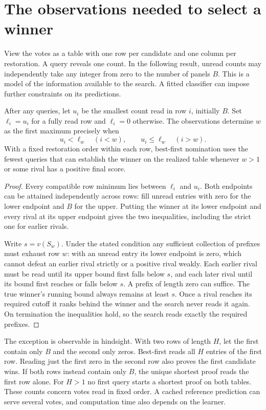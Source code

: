 \section{The observations needed to select a winner}
\label{sec:certificate}
View the votes as a table with one row per candidate and one column per restoration. A query reveals one count. In the following result, unread counts may independently take any integer from zero to the number of panels \(B\). This is a model of the information available to the search. A fitted classifier can impose further constraints on its predictions.

\begin{proposition}
After any queries, let \(u_i\) be the smallest count read in row \(i\), initially \(B\). Set \(\ell_i=u_i\) for a fully read row and \(\ell_i=0\) otherwise. The observations determine \(w\) as the first maximum precisely when
\[
  u_i<\ell_w\quad(i<w),\qquad u_i\le\ell_w\quad(i>w).
\]
With a fixed restoration order within each row, best-first nomination uses the fewest queries that can establish the winner on the realized table whenever \(w>1\) or some rival has a positive final score.
\end{proposition}

\begin{proof}
Every compatible row minimum lies between \(\ell_i\) and \(u_i\). Both endpoints can be attained independently across rows: fill unread entries with zero for the lower endpoint and \(B\) for the upper. Putting the winner at its lower endpoint and every rival at its upper endpoint gives the two inequalities, including the strict one for earlier rivals.

Write \(s=v(S_w)\). Under the stated condition any sufficient collection of prefixes must exhaust row \(w\): with an unread entry its lower endpoint is zero, which cannot defeat an earlier rival strictly or a positive rival weakly. Each earlier rival must be read until its upper bound first falls below \(s\), and each later rival until its bound first reaches or falls below \(s\). A prefix of length zero can suffice. The true winner's running bound always remains at least \(s\). Once a rival reaches its required cutoff it ranks behind the winner and the search never reads it again. On termination the inequalities hold, so the search reads exactly the required prefixes.
\end{proof}

The exception is observable in hindsight. With two rows of length \(H\), let the first contain only \(B\) and the second only zeros. Best-first reads all \(H\) entries of the first row. Reading just the first zero in the second row also proves the first candidate wins. If both rows instead contain only \(B\), the unique shortest proof reads the first row alone. For \(H>1\) no first query starts a shortest proof on both tables. These counts concern votes read in fixed order. A cached reference prediction can serve several votes, and computation time also depends on the learner.
